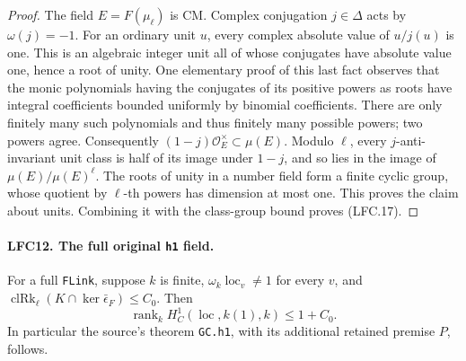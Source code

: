\begin{proof}
The field \(E=F(\mu_\ell)\) is CM.  Complex conjugation
\(j\in\Delta\) acts by \(\omega(j)=-1\).
For an ordinary unit \(u\), every complex absolute value
of \(u/j(u)\) is one.  This is an algebraic integer unit
all of whose conjugates have absolute value one, hence
a root of unity.  One elementary proof of this last fact
observes that the monic polynomials having the conjugates
of its positive powers as roots have integral coefficients
bounded uniformly by binomial coefficients.  There are
only finitely many such polynomials and thus finitely many
possible powers; two powers agree.
Consequently \((1-j)\mathcal O_E^\times\subset\mu(E)\).
Modulo \(\ell\), every \(j\)-anti-invariant unit class is
half of its image under \(1-j\), and so lies in the image
of \(\mu(E)/\mu(E)^\ell\).
The roots of unity in a number field form a finite cyclic
group, whose quotient by \(\ell\)-th powers has dimension
at most one.  This proves the claim about units.
Combining it with the class-group bound proves (LFC.17).
\end{proof}

\paragraph{LFC12. The full original \texttt{h1} field.}
\label{claim:LFC12}
For a full \texttt{FLink}, suppose \(k\) is finite,
\(\omega_k\operatorname{loc}_v\ne1\) for every \(v\), and
\(\operatorname{clRk}_\ell(K\cap\ker\bar\epsilon_F)\le C_0\).
Then
\[
 \operatorname{rank}_k
       H^1_C(\operatorname{loc},k(1),k)\le1+C_0.          \tag{LFC.19}
\]
In particular the source's theorem \texttt{GC.h1}, with
its additional retained premise \(P\), follows.

